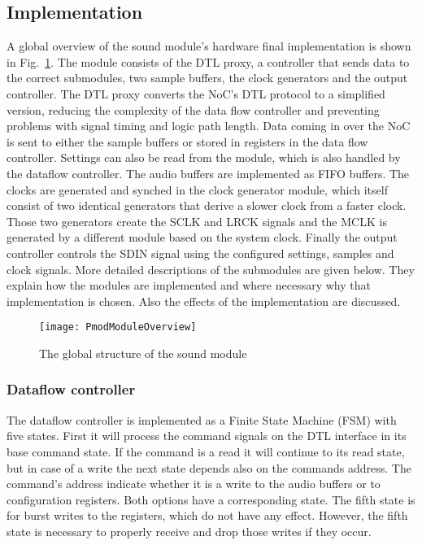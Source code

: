 \subsection{Implementation}
A global overview of the sound module's hardware final implementation is shown in Fig.~\ref{fig:overview}. The module consists of the DTL proxy, a controller that sends data to the correct submodules, two sample buffers, the clock generators and the output controller. The DTL proxy converts the NoC's DTL protocol to a simplified version, reducing the complexity of the data flow controller and preventing problems with signal timing and logic path length. Data coming in over the NoC is sent to either the sample buffers or stored in registers in the data flow controller. Settings can also be read from the module, which is also handled by the dataflow controller. The audio buffers are implemented as FIFO buffers. The clocks are generated and synched in the clock generator module, which itself consist of two identical generators that derive a slower clock from a faster clock. Those two generators create the SCLK and LRCK signals and the MCLK is generated by a different module based on the system clock. Finally the output controller controls the SDIN signal using the configured settings, samples and clock signals. More detailed descriptions of the submodules are given below. They explain how the modules are implemented and where necessary why that implementation is chosen. Also the effects of the implementation are discussed.
\begin{figure}[h]
 \texttt{[image: PmodModuleOverview]}
 \caption{The global structure of the sound module}
 \label{fig:overview}
\end{figure}
\subsubsection{Dataflow controller}
The dataflow controller is implemented as a Finite State Machine (FSM) with five states. First it will process the command signals on the DTL interface in its base command state. If the command is a read it will continue to its read state, but in case of a write the next state depends also on the commands address. The command's address indicate whether it is a write to the audio buffers or to configuration registers. Both options have a corresponding state. The fifth state is for burst writes to the registers, which do not have any effect. However, the fifth state is necessary to properly receive and drop those writes if they occur. 

